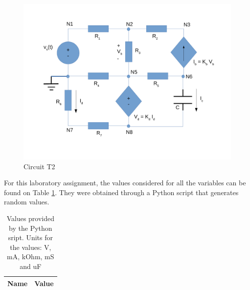 \begin{figure}[ht]
	\centering
	\includegraphics[width=0.75\linewidth]{dsnh_t2.pdf}
	\caption{Circuit T2}
\label{fig:Desenho_t2}
\end{figure}



For this laboratory assignment, the values considered for all the variables can be
found on Table \ref{tab:given_vls}. They were obtained through a Python script that
generates random values. 

\begin{table}[ht]
	\centering
	\begin{tabular}{|l|r|}
		\hline    
		{\bf Name} & {\bf Value} \\ \hline
    		
	\end{tabular}
	
	\caption{Values provided by the Python sript. Units for the values: V, mA, kOhm, mS and uF}
    
\label{tab:given_vls}
\end{table}

